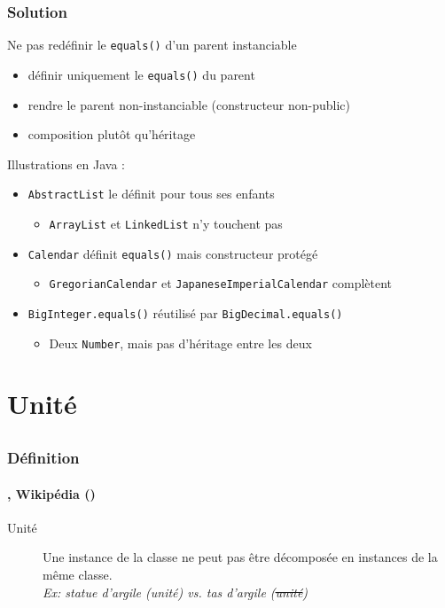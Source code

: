 \documentclass[draft]{beamer}
\DeclareRobustCommand{\todo}[1]{\ifdraft{\textbf{\textcolor{red}{[#1]}}}{}}
\newcommand{\citecustom}[2]{#2 (\citeyear{#1})}
\begin{document}
\begin{frame}
\frametitle{Solution}
\begin{exampleblock}{Ne pas redéfinir le \lstinline{equals()} d'un parent instanciable}
 \begin{itemize}
  \item définir uniquement le \lstinline{equals()} du parent
  \item rendre le parent non-instanciable (constructeur non-public)
  \item composition plutôt qu'héritage
 \end{itemize}
\end{exampleblock}
Illustrations en Java :
\begin{itemize}
 \item \lstinline{AbstractList} le définit pour tous ses enfants
 \begin{itemize}
  \item \lstinline{ArrayList} et \lstinline{LinkedList} n'y touchent pas
 \end{itemize}
 \item \lstinline{Calendar} définit \lstinline{equals()} mais constructeur protégé
 \begin{itemize}\scriptsize
  \item \lstinline{GregorianCalendar} et \lstinline{JapaneseImperialCalendar} complètent
 \end{itemize}
 \item \small\lstinline{BigInteger.equals()} réutilisé par \lstinline{BigDecimal.equals()}
 \begin{itemize}
  \item Deux \lstinline{Number}, mais pas d'héritage entre les deux
 \end{itemize}
\end{itemize}
\end{frame}

\section{Unité}
\subsection{}

\begin{frame}
\frametitle{Définition}
\framesubtitle{\cite{goos_ontological_2000,staab_overview_2004}, \citecustom{noauthor_ontoclean_2019}{Wikipédia}}
\begin{description}
 \item[Unité] Une instance de la classe ne peut pas être décomposée en instances de la même classe.\\
      {\footnotesize\textit{Ex: statue d'argile (unité) vs. tas d'argile (\sout{unité})}}
\end{description}
\todo{...}
\end{frame}
\end{document}
